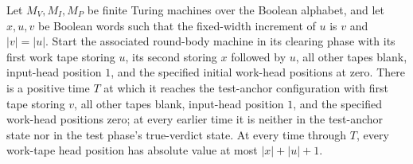\begin{theorem}
\label{Complexity.b2b_reject_suffix}
\leanok
{}
Let $M_V,M_I,M_P$ be finite Turing machines over the Boolean alphabet, and let $x,u,v$
be Boolean words such that the fixed-width increment of $u$ is $v$ and $|v|=|u|$. Start
the associated round-body machine in its clearing phase with its first work tape storing
$u$, its second storing $x$ followed by $u$, all other tapes blank, input-head position
$1$, and the specified initial work-head positions at zero. There is a positive time $T$
at which it reaches the test-anchor configuration with first tape storing $v$, all other
tapes blank, input-head position $1$, and the specified work-head positions zero; at
every earlier time it is neither in the test-anchor state nor in the test phase's
true-verdict state. At every time through $T$, every work-tape head position has
absolute value at most $|x|+|u|+1$.
\end{theorem}

